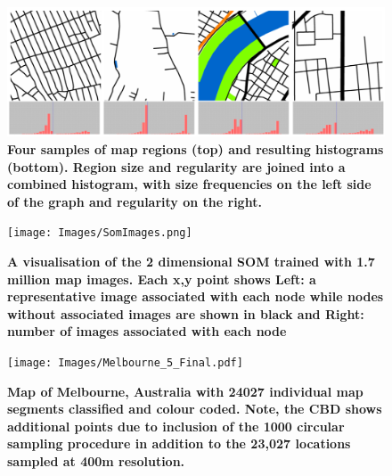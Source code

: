 \documentclass{article}
\begin{document}
\begin{figure}
    \centering    
\includegraphics[scale=0.55]{Images/HistSamples.png}  
\caption{\bf Four samples of map regions (top) and resulting histograms (bottom). Region size and regularity are joined into a combined histogram, with size frequencies on the left side of the graph and regularity on the right.}    
 \label{fig:mapsandHist}  
\end{figure} 

\begin{figure}
\centering    
\texttt{[image: Images/SomImages.png]}  
\caption{\bf  A visualisation of the 2 dimensional SOM trained with 1.7 million map images.  Each x,y point shows Left: a representative image associated with each node while nodes without associated images are shown in black and Right: number of images associated with each node}    
 \label{fig:somresults}  
\end{figure} 

\begin{figure}
\centering    
\texttt{[image: Images/Melbourne\_5\_Final.pdf]}  
\caption{\bf  Map of Melbourne, Australia with 24027 individual map segments classified and colour coded. Note, the CBD shows additional points due to inclusion of the 1000 circular sampling procedure in addition to the 23,027 locations sampled at 400m resolution. }    
 \label{fig:mel23000}  
\end{figure} 
\end{document}
